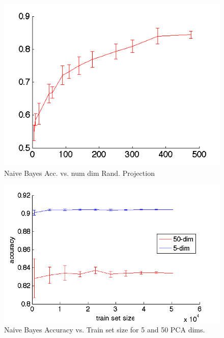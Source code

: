 \documentclass[]{article}
\begin{document}
\begin{center}
\begin{figure}[h!]
\centering
\includegraphics[width=.5\textwidth]{../images/accuracy_vs_dim_randproj.png}
\caption{Naive Bayes Acc. vs. num dim Rand. Projection}
\label{fig:nb_rand_proj}
\end{figure}
\end{center}


\begin{center}
\begin{figure}[h!]
\centering
\includegraphics[width=.5\textwidth]{../images/nb_5_vs_50.png}
\caption{Naive Bayes Accuracy vs. Train set size for 5 and 50 PCA dims.}
\label{fig:5_vs_50_pca}
\end{figure}
\end{center}
\end{document}
